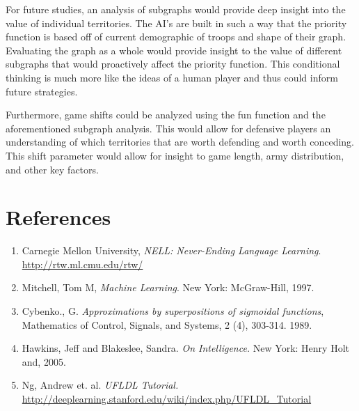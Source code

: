 \documentclass[12pt]{article}  %
\begin{document}
For future studies, an analysis of subgraphs would provide deep insight into the value of individual territories. The AI’s are built in such a way that the priority function is based off of current demographic of troops and shape of their graph. Evaluating the graph as a whole would provide insight to the value of different subgraphs that would proactively affect the priority function. This conditional thinking is much more like the ideas of a human player and thus could inform future strategies. 

Furthermore, game shifts could be analyzed using the fun function and the aforementioned subgraph analysis. This would allow for defensive players an understanding of which territories that are worth defending and worth conceding. This shift parameter would allow for insight to game length, army distribution, and other key factors.  





\section{References}


\begin{enumerate}

\item Carnegie Mellon University, \emph{NELL: Never-Ending Language Learning}. \url{http://rtw.ml.cmu.edu/rtw/}\label{NELL}

\item Mitchell, Tom M, \emph{Machine Learning}. New York: McGraw-Hill, 1997.\label{Mitchell}

\item Cybenko., G. \emph{Approximations by superpositions of sigmoidal functions}, Mathematics of Control, Signals, and Systems, 2 (4), 303-314. 1989. \label{Cybenko}

\item Hawkins, Jeff and Blakeslee, Sandra. \emph{On Intelligence.} New York: Henry Holt and, 2005. \label{Hawkins}

\item Ng, Andrew et. al. \emph{UFLDL Tutorial.} \url{http://deeplearning.stanford.edu/wiki/index.php/UFLDL_Tutorial}\label{UFLDL}


\end{enumerate}
\end{document}
